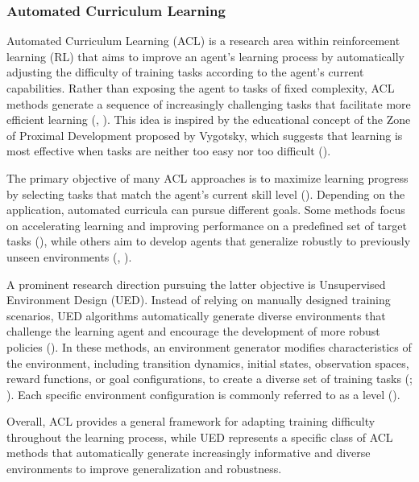 \subsubsection{Automated Curriculum Learning} 

Automated Curriculum Learning (ACL) is a research area within reinforcement learning (RL) that aims to improve an agent's learning process by automatically adjusting the difficulty of training tasks according to the agent's current capabilities. Rather than exposing the agent to tasks of fixed complexity, ACL methods generate a sequence of increasingly challenging tasks that facilitate more efficient learning (\cite{Portelas2020ACL}, \cite{Narvekar2020CurriculumLearning}). This idea is inspired by the educational concept of the Zone of Proximal Development proposed by Vygotsky, which suggests that learning is most effective when tasks are neither too easy nor too difficult (\cite{vygotsky2011interaction}).

The primary objective of many ACL approaches is to maximize learning progress by selecting tasks that match the agent's current skill level (\cite{florensa2018automatic}). Depending on the application, automated curricula can pursue different goals. Some methods focus on accelerating learning and improving performance on a predefined set of target tasks (\cite{garcin2024dredzeroshottransferreinforcement}), while others aim to develop agents that generalize robustly to previously unseen environments (\cite{dennis2020}, \cite{jiang2021replay}).

A prominent research direction pursuing the latter objective is Unsupervised Environment Design (UED). Instead of relying on manually designed training scenarios, UED algorithms automatically generate diverse environments that challenge the learning agent and encourage the development of more robust policies (\cite{dennis2020}). In these methods, an environment generator modifies characteristics of the environment, including transition dynamics, initial states, observation spaces, reward functions, or goal configurations, to create a diverse set of training tasks (\cite{florensa2018automatic}; \cite{dennis2020}). Each specific environment configuration is commonly referred to as a level (\cite{dennis2020}).

Overall, ACL provides a general framework for adapting training difficulty throughout the learning process, while UED represents a specific class of ACL methods that automatically generate increasingly informative and diverse environments to improve generalization and robustness.    